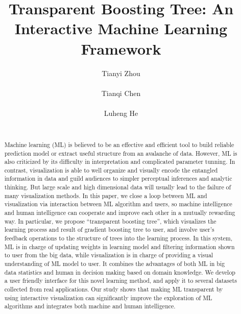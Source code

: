 \documentclass{chi2009}
\begin{document}
\setlength{\paperheight}{11in}
\setlength{\paperwidth}{8.5in}
\setlength{\pdfpageheight}{\paperheight}
\setlength{\pdfpagewidth}{\paperwidth}


\title{Transparent Boosting Tree: An Interactive Machine Learning Framework}
\author{
  \alignauthor Tianyi Zhou\\
    \\
  \alignauthor Tianqi Chen\\
    \\
  \alignauthor Luheng He\\
    \\
}

\maketitle

\begin{abstract}
Machine learning (ML) is believed to be an effective and efficient tool to build reliable prediction model or extract useful structure from an avalanche of data. However, ML is also criticized by its difficulty in interpretation and complicated parameter tunning. In contrast, visualization is able to well organize and visually encode the entangled information in data and guild audiences to simpler perceptual inferences and analytic thinking. But large scale and high dimensional data will usually lead to the failure of many visualization methods. In this paper, we close a loop between ML and visualization via interaction between ML algorithm and users, so machine intelligence and human intelligence can cooperate and improve each other in a mutually rewarding way. In particular, we propose ``transparent boosting tree'', which visualizes the learning process and result of gradient boosting tree to user, and involve user's feedback operations to the structure of trees into the learning process. In this system, ML is in charge of updating weights in learning model and filtering information shown to user from the big data, while visualization is in charge of providing a visual understanding of ML model to user. It combines the advantages of both ML in big data statistics and human in decision making based on domain knowledge. We develop a user friendly interface for this novel learning method, and apply it to several datasets collected from real applications. Our study shows that making ML transparent by using interactive visualization can significantly improve the exploration of ML algorithms and integrates both machine and human intelligence.   
\end{abstract}
\end{document}
